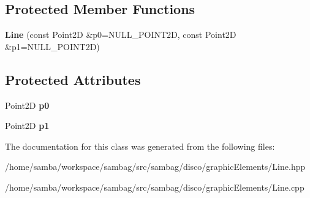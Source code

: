 \subsection*{Protected Member Functions}
\begin{DoxyCompactItemize}
\item 
\hypertarget{classsambag_1_1disco_1_1graphic_elements_1_1_line_a3b7d18298aa7c0e62904f8d468dbbbab}{
{\bfseries Line} (const Point2D \&p0=NULL\_\-POINT2D, const Point2D \&p1=NULL\_\-POINT2D)}
\label{classsambag_1_1disco_1_1graphic_elements_1_1_line_a3b7d18298aa7c0e62904f8d468dbbbab}

\end{DoxyCompactItemize}
\subsection*{Protected Attributes}
\begin{DoxyCompactItemize}
\item 
\hypertarget{classsambag_1_1disco_1_1graphic_elements_1_1_line_a2abb8091dcc27381c0543c0fd094b6ff}{
Point2D {\bfseries p0}}
\label{classsambag_1_1disco_1_1graphic_elements_1_1_line_a2abb8091dcc27381c0543c0fd094b6ff}

\item 
\hypertarget{classsambag_1_1disco_1_1graphic_elements_1_1_line_ab2c8d73e1dfe1d6a284c112e5e3abe7c}{
Point2D {\bfseries p1}}
\label{classsambag_1_1disco_1_1graphic_elements_1_1_line_ab2c8d73e1dfe1d6a284c112e5e3abe7c}

\end{DoxyCompactItemize}


The documentation for this class was generated from the following files:\begin{DoxyCompactItemize}
\item 
/home/samba/workspace/sambag/src/sambag/disco/graphicElements/Line.hpp\item 
/home/samba/workspace/sambag/src/sambag/disco/graphicElements/Line.cpp\end{DoxyCompactItemize}
